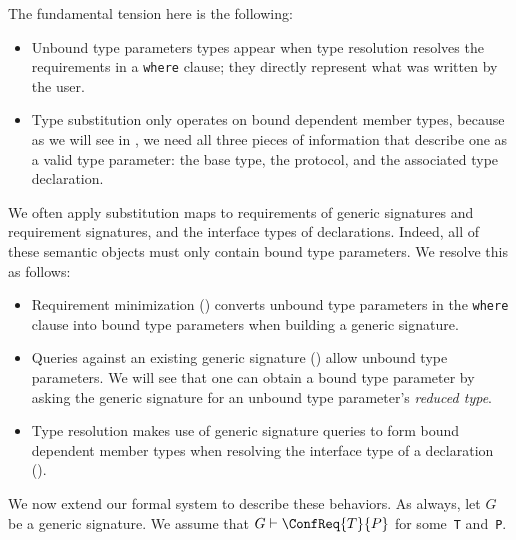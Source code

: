 \documentclass[../generics]{subfiles}
\begin{document}
The fundamental tension here is the following:
\begin{itemize}
\item Unbound type parameters types appear when type resolution resolves the requirements in a \texttt{where} clause; they directly represent what was written by the user.

\item Type substitution only operates on bound dependent member types, because as we will see in , we need all three pieces of information that describe one as a valid type parameter: the base type, the protocol, and the associated type declaration.
\end{itemize}
We often apply substitution maps to requirements of generic signatures and requirement signatures, and the interface types of declarations. Indeed, all of these semantic objects must only contain bound type parameters. We resolve this as follows:
\begin{itemize}
\item Requirement minimization () converts unbound type parameters in the \texttt{where} clause into bound type parameters when building a generic signature.
\item Queries against an existing generic signature () allow unbound type parameters. We will see that one can obtain a bound type parameter by asking the generic signature for an unbound type parameter's \emph{reduced type}.
\item Type resolution makes use of generic signature queries to form bound dependent member types when resolving the interface type of a declaration ().
\end{itemize}

We now extend our formal system to describe these behaviors. As always, let $G$ be a generic signature. We assume that $G\vdash\ConfReq{T}{P}$ for some~\texttt{T} and~\texttt{P}.
\end{document}
